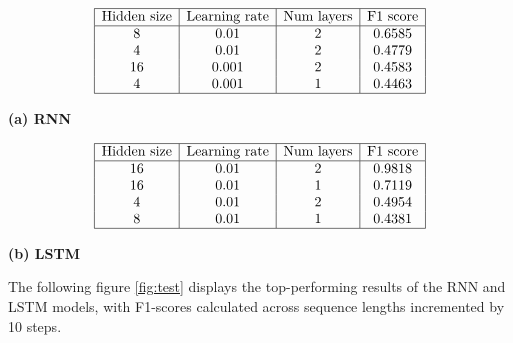 \documentclass[12pt,a4paper]{article}
\begin{document}
\scriptsize
\noindent
\begin{minipage}[c]{0.5\textwidth}
\[
\begin{array}{|c|c|c|c|}
\hline
\text{Hidden size} & \text{Learning rate} & \text{Num layers} & \text{F1 score} \\
\hline
8 & 0.01 & 2 & 0.6585 \\
4 & 0.01 & 2 & 0.4779 \\
16 & 0.001 & 2 & 0.4583 \\
4 & 0.001 & 1 & 0.4463 \\
\hline
\end{array}
\]
\begin{center}
    \textbf{(a) RNN}
\end{center}
\end{minipage}\hfill
\begin{minipage}[c]{0.5\textwidth}
\[
\begin{array}{|c|c|c|c|}
\hline
\text{Hidden size} & \text{Learning rate} & \text{Num layers} & \text{F1 score} \\
\hline
16 & 0.01 & 2 & 0.9818 \\
16 & 0.01 & 1 & 0.7119 \\
4 & 0.01 & 2 & 0.4954 \\
8 & 0.01 & 1 & 0.4381 \\
\hline
\end{array}
\]
\begin{center}
    \textbf{(b) LSTM}
\end{center}
\end{minipage}\vspace{0.5em}

\normalsize

The following figure \ref{fig:test} displays the top-performing results of the RNN and LSTM models, with F1-scores calculated across sequence lengths incremented by 10 steps.
\end{document}
